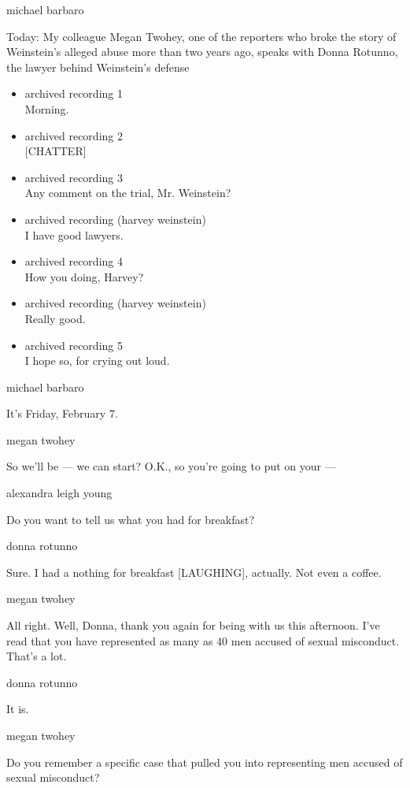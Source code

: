 michael barbaro

Today: My colleague Megan Twohey, one of the reporters who broke the
story of Weinstein's alleged abuse more than two years ago, speaks with
Donna Rotunno, the lawyer behind Weinstein's defense

\begin{itemize}
\item
  archived recording 1\\
  Morning.
\item
  archived recording 2\\
  {[}CHATTER{]}
\item
  archived recording 3\\
  Any comment on the trial, Mr. Weinstein?
\item
  archived recording (harvey weinstein)\\
  I have good lawyers.
\item
  archived recording 4\\
  How you doing, Harvey?
\item
  archived recording (harvey weinstein)\\
  Really good.
\item
  archived recording 5\\
  I hope so, for crying out loud.
\end{itemize}

michael barbaro

It's Friday, February 7.

megan twohey

So we'll be --- we can start? O.K., so you're going to put on your ---

alexandra leigh young

Do you want to tell us what you had for breakfast?

donna rotunno

Sure. I had a nothing for breakfast {[}LAUGHING{]}, actually. Not even a
coffee.

megan twohey

All right. Well, Donna, thank you again for being with us this
afternoon. I've read that you have represented as many as 40 men accused
of sexual misconduct. That's a lot.

donna rotunno

It is.

megan twohey

Do you remember a specific case that pulled you into representing men
accused of sexual misconduct?

